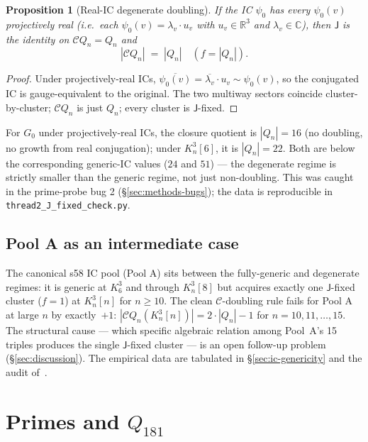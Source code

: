 \documentclass[12pt,a4paper]{article}
\newtheorem{proposition}[theorem]{Proposition}
\theoremstyle{definition}
\theoremstyle{remark}
\newcommand{\bC}{\mathbb{C}}
\newcommand{\bR}{\mathbb{R}}
\newcommand{\Kn}{K_n^3}
\newcommand{\Qn}{Q_n}
\newcommand{\Ccls}{\mathcal{C}}             %
\newcommand{\Jconj}{\mathsf{J}}             %
\newcommand{\proj}{\mathrel{\sim}}          %
\begin{document}
\begin{proposition}[Real-IC degenerate doubling]
\label{prop:real-IC-collapse}
If the IC $\psi_0$ has every $\psi_0(v)$ projectively real (i.e.\
each $\psi_0(v) = \lambda_v \cdot u_v$ with $u_v \in \bR^3$ and
$\lambda_v \in \bC$), then $\Jconj$ is the identity on
$\Ccls\Qn = \Qn$ and
\[
|\Ccls\Qn| \;=\; |\Qn| \quad (f = |\Qn|).
\]
\end{proposition}

\begin{proof}
Under projectively-real ICs, $\overline{\psi_0(v)} = \overline{\lambda_v}
\cdot u_v \proj \psi_0(v)$, so the conjugated IC is gauge-equivalent
to the original. The two multiway sectors coincide cluster-by-cluster;
$\Ccls\Qn$ is just $\Qn$; every cluster is $\Jconj$-fixed.
\end{proof}

For $G_0$ under projectively-real ICs, the closure quotient is
$|\Qn| = 16$ (no doubling, no growth from real conjugation); under
$\Kn[6]$, it is $|\Qn| = 22$. Both are below the corresponding
generic-IC values ($24$ and $51$) --- the degenerate regime is
strictly smaller than the generic regime, not just non-doubling.
This was caught in the prime-probe bug 2 (\S\ref{sec:methods-bugs});
the data is reproducible in \texttt{thread2\_J\_fixed\_check.py}.

\subsection{Pool A as an intermediate case}\label{sec:J-Pool-A}

The canonical s58 IC pool (Pool A) sits between the fully-generic and
degenerate regimes: it is generic at $K_6^3$ and through $\Kn[8]$
but acquires exactly one $\Jconj$-fixed cluster ($f = 1$) at $\Kn[n]$
for $n \ge 10$. The clean $\Ccls$-doubling rule fails for Pool A at
large $n$ by exactly~$+1$: $|\Ccls\Qn(\Kn[n])| = 2 \cdot |\Qn| - 1$
for $n = 10, 11, \dots, 15$. The structural cause --- which specific
algebraic relation among Pool~A's 15 triples produces the single
$\Jconj$-fixed cluster --- is an open follow-up
problem (\S\ref{sec:discussion}). The empirical data are tabulated in
\S\ref{sec:ic-genericity} and the audit
of~\cite{closure-v5-audit-threebug}.

\section{Primes and $Q_{181}$}\label{sec:primes}
\end{document}

